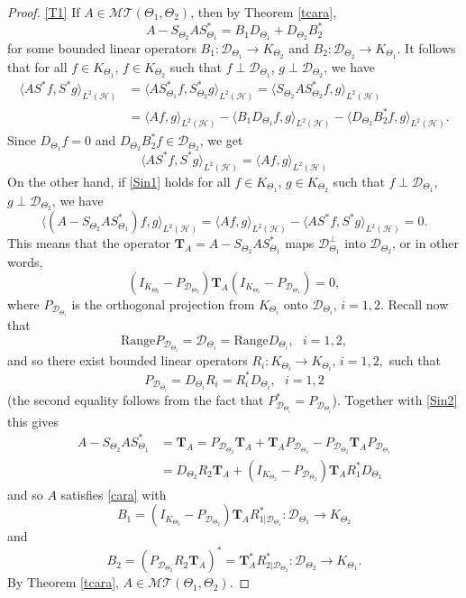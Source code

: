 \documentclass[11pt]{amsart}
\numberwithin{equation}{section}
\newcommand{\hsp}{\mathcal{H}}
\newcommand{\T}{{\mathbf{T}}}
\theoremstyle{definition}
\numberwithin{equation}{section}
\begin{document}
\begin{proof}
\eqref{T1} If $A\in \mathcal{MT}(\Theta_1, \Theta_2)$, then by Theorem \ref{tcara},
$$A-S_{\Theta_2}AS_{\Theta_1}^*=B_1D_{\Theta_1}+D_{\Theta_2}B_2^*$$
for some bounded linear operators $B_1: \mathcal{D}_{\Theta_1}\to K_{\Theta_2}$ and $B_2: \mathcal{D}_{\Theta_2}\to K_{\Theta_1}$. It follows that for all $f\in K_{\Theta_1}$, $f\in K_{\Theta_2}$ such that $f\perp\mathcal{D}_{\Theta_1}$, $g\perp\mathcal{D}_{\Theta_2}$, we have
\begin{align*}
\langle AS^*f, S^*g\rangle_{L^2(\hsp)}
&=\langle A S^*_{\Theta_1}f,S^*_{\Theta_2}g\rangle_{L^2(\hsp)}=\langle  S_{\Theta_2}AS^*_{\Theta_2}f, g\rangle_{L^2(\hsp)}\\
&=\langle Af, g\rangle_{L^2(\hsp)}-\langle B_1D_{\Theta_1}f,g\rangle_{L^2(\hsp)}-\langle D_{\Theta_2}B_2^*f,g\rangle_{L^2(\hsp)}.
\end{align*}
Since $D_{\Theta_1}f=0$ and $D_{\Theta_2}B_2^*f\in \mathcal{D}_{\Theta_2}$, we get
\begin{equation}\label{Sin1}
\langle AS^*f, S^*g\rangle_{L^2(\hsp)}=\langle A f,g\rangle_{L^2(\hsp)}
\end{equation}
On the other hand, if \eqref{Sin1} holds for all $f\in K_{\Theta_1}$, $g\in K_{\Theta_2}$ such that $f\perp \mathcal{D}_{\Theta_1}$, $g\perp \mathcal{D}_{\Theta_2}$, we have
$$\langle (A-S_{\Theta_2}AS_{\Theta_1}^*)f,g\rangle_{L^2(\hsp)}=\langle Af,g\rangle_{L^2(\hsp)}- \langle AS^*f,S^*g\rangle_{L^2(\hsp)}=0.$$
This means that the operator $\T_A=A-S_{\Theta_2}AS_{\Theta_1}^*$ maps $\mathcal{D}^{\perp}_{\Theta_1}$ into $\mathcal{D}_{\Theta_2}$, or in other words,
\begin{equation}\label{Sin2}
(I_{K_{\Theta_2}}-P_{\mathcal{D}_{\Theta_2}})\T_A(I_{K_{\Theta_1}}-P_{\mathcal{D}_{\Theta_1}})=0,
\end{equation}
where $P_{\mathcal{D}_{\Theta_i}}$ is the orthogonal projection from $K_{\Theta_i}$ onto $\mathcal{D}_{\Theta_i}$, $i=1,2$.
Recall now that
$$\text{Range}P_{\mathcal{D}_{\Theta_i}}=\mathcal{D}_{\Theta_i}=\text{Range}D_{\Theta_i},~~~ i=1,2,$$
and so there exist bounded linear operators $R_i: K_{\Theta_i}\to K_{\Theta_i}$, $i=1,2,$ such that
$$P_{\mathcal{D}_{\Theta_i}}=D_{\Theta_i}R_i=R_i^*D_{\Theta_i}, ~~~ i=1,2$$
(the second equality follows from the fact that $P_{\mathcal{D}_{\Theta_i}}^*=P_{\mathcal{D}_{\Theta_i}}$). Together with \eqref{Sin2} this gives
\begin{align*}
A-S_{\Theta_2}AS_{\Theta_1}^*
&=\T_A=P_{\mathcal{D}_{\Theta_2}}\T_A+\T_AP_{\mathcal{D}_{\Theta_2}}-P_{\mathcal{D}_{\Theta_2}}\T_AP_{\mathcal{D}_{\Theta_1}}\\
&=D_{\Theta_2}R_2\T_A+(I_{K_{\Theta_2}}-P_{\mathcal{D}_{\Theta_2}})\T_AR_1^*D_{\Theta_1}
\end{align*}
and so $A$ satisfies \eqref{cara} with
$$B_1=(I_{K_{\Theta_2}}-P_{\mathcal{D}_{\Theta_2}})
\T_AR^*_{1|\mathcal{D}_{\Theta_1}}:
\mathcal{D}_{\Theta_1}\to K_{\Theta_2}$$
and
$$B_2=(P_{\mathcal{D}_{\Theta_2}}R_2\T_A)^*=\T_A^*R^*_{2|\mathcal{D}_{\Theta_2}}:\mathcal{D}_{\Theta_2}\to K_{\Theta_1}.$$
By Theorem \ref{tcara}, $A\in \mathcal{MT}(\Theta_1, \Theta_2)$.


\end{proof}
\end{document}
